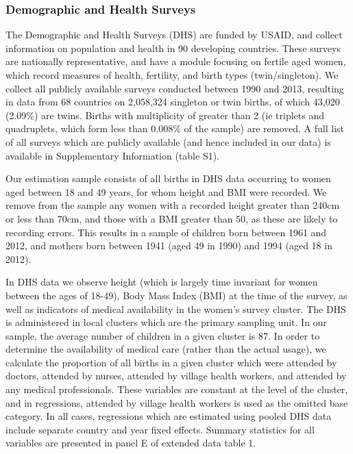 \documentclass{nature}
\begin{document}
\begin{linenumbers}
\subsubsection{Demographic and Health Surveys}
The Demographic and Health Surveys (DHS) are funded by USAID, and collect information on population and health in 90 developing countries.  These surveys are nationally representative, and have a module focusing on fertile aged women, which record measures of health, fertility, and birth types (twin/singleton).  We collect all publicly available surveys conducted between 1990 and 2013, resulting in data from 68 countries on 2,058,324 singleton or twin births, of which 43,020 (2.09\%) are twins.  Births with multiplicity of greater than 2 (ie triplets and quadruplets, which form less than 0.008\% of the sample) are removed.  A full list of all surveys which are publicly available (and hence included in our data) is available in Supplementary Information (table S1).

Our estimation sample consists of all births in DHS data occurring to women aged between 18 and 49 years, for whom height and BMI were recorded.  We remove from the sample any women with a recorded height greater than 240cm or less than 70cm, and those with a BMI greater than 50, as these are likely to recording errors.  This results in a sample of children born between 1961 and 2012, and mothers born between 1941 (aged 49 in 1990) and 1994 (aged 18 in 2012).  

In DHS data we observe height (which is largely time invariant for women between the ages of 18-49), Body Mass Index (BMI) at the time of the survey, as well as indicators of medical availability in the women's survey cluster.  The DHS is administered in local clusters which are the primary sampling unit.  In our sample, the average number of children in a given cluster is 87.  In order to determine the availability of medical care (rather than the actual usage), we calculate the proportion of all births in a given cluster which were attended by doctors, attended by nurses, attended by village health workers, and attended by any medical professionals.  These variables are constant at the level of the cluster, and in regressions, attended by village health workers is used as the omitted base category.  In all cases, regressions which are estimated using pooled DHS data include separate country and year fixed effects.  Summary statistics for all variables are presented in panel E of extended data table 1.


\end{linenumbers}
\end{document}
